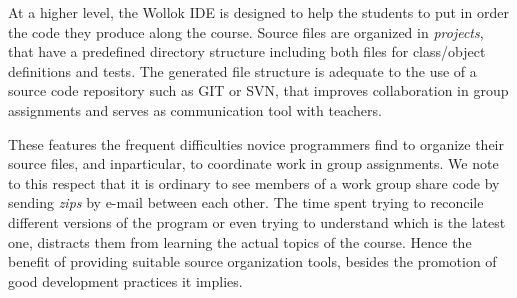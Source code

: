 \medskip
At a higher level, the Wollok IDE is designed to help the students to put in order the code they produce along the course. 
Source files are organized in \emph{projects}, that have a predefined directory structure including both files for class/object definitions and tests.
The generated file structure is adequate to the use of a source code repository such as GIT or SVN, that improves collaboration in group assignments and serves as communication tool with teachers.

These features the frequent difficulties novice programmers find to organize their source files, and inparticular, to coordinate work in group assignments.
We note to this respect that it is ordinary to see members of a work group share code by sending \emph{zips} by e-mail between each other.
The time spent trying to reconcile different versions of the program or even trying to understand which is the latest one, distracts them from learning the actual topics of the course.
Hence the benefit of providing suitable source organization tools, besides the promotion of good development practices it implies.

%

